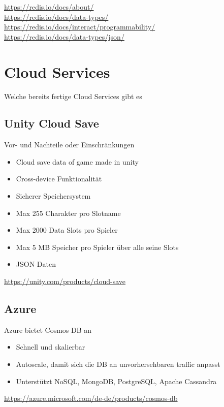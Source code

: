 \url{https://redis.io/docs/about/}\\
\url{https://redis.io/docs/data-types/}\\
\url{https://redis.io/docs/interact/programmability/}\\
\url{https://redis.io/docs/data-types/json/}

\section{Cloud Services}
Welche bereits fertige Cloud Services gibt es

\subsection{Unity Cloud Save} 
Vor- und Nachteile oder Einschränkungen\\

\begin{itemize}
    \item Cloud save data of game made in unity
    \item Cross-device Funktionalität
    \item Sicherer Speichersystem
    \item Max 255 Charakter pro Slotname
    \item Max 2000 Data Slots pro Spieler
    \item Max 5 MB Speicher pro Spieler über alle seine Slots
    \item JSON Daten
\end{itemize}

\url{https://unity.com/products/cloud-save}

\subsection{Azure}
Azure bietet Cosmos DB an \\
\begin{itemize}
    \item Schnell und skalierbar
    \item Autoscale, damit sich die DB an unvorhersehbaren traffic anpasst
    \item Unterstützt NoSQL, MongoDB, PostgreSQL, Apache Cassandra
\end{itemize}

\url{https://azure.microsoft.com/de-de/products/cosmos-db}

